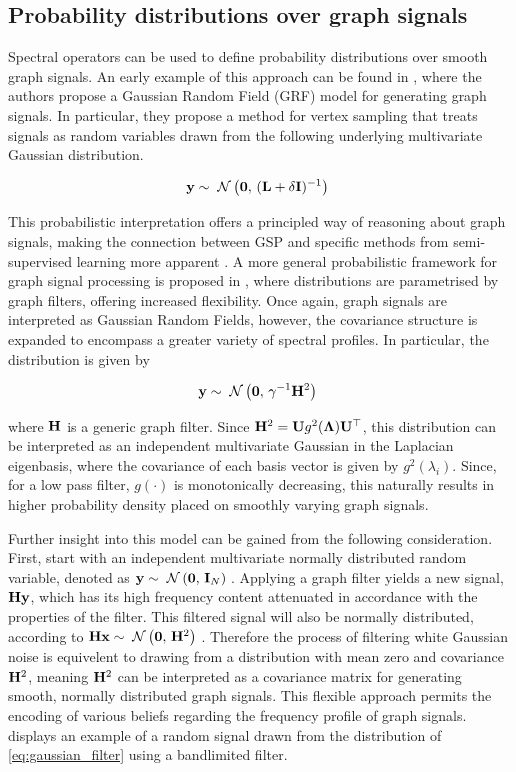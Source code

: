 \subsection{Probability distributions over graph signals}

Spectral operators can be used to define probability distributions over smooth graph signals. An early example of this approach can be found in \cite{Gadde2015}, where the authors propose a Gaussian Random Field (GRF) model for generating graph signals. In particular, they propose a method for vertex sampling that treats signals as random variables drawn from the following underlying multivariate Gaussian distribution.

\begin{equation}
\mathbf{y} \sim \; \mathcal{N}\left(\mathbf{0}, \, (\mathbf{L} + \delta \mathbf{I})^{-1}\right) \;
\end{equation}

This probabilistic interpretation offers a principled way of reasoning about graph signals, making the connection between GSP and specific methods from semi-supervised learning more apparent \citep{Zhu2003}. A more general probabilistic framework for graph signal processing is proposed in \cite{Zhang2015}, where distributions are parametrised by graph filters, offering increased flexibility. Once again, graph signals are interpreted as Gaussian Random Fields, however, the covariance structure is expanded to encompass a greater variety of spectral profiles. In particular, the distribution is given by 

\begin{equation}
    \label{eq:gaussian_filter}
    \mathbf{y} \sim \; \mathcal{N}\left(\mathbf{0}, \, \gamma^{-1} \mathbf{H}^2\right) \;
\end{equation}


where $\mathbf{H}$ is a generic graph filter. Since $\mathbf{H}^2 = \mathbf{U} g^2(\mathbf{\Lambda}) \mathbf{U}^\top$, this distribution can be interpreted as an independent multivariate Gaussian in the Laplacian eigenbasis, where the covariance of each basis vector is given by $g^2(\lambda_i)$. Since, for a low pass filter, $g(\cdot)$ is monotonically decreasing, this naturally results in higher probability density placed on smoothly varying graph signals. 


Further insight into this model can be gained from the following consideration. First, start with an independent multivariate normally distributed random variable, denoted as $\mathbf{y} \sim \; \mathcal{N}\left(\mathbf{0}, \, \mathbf{I}_N\right) \;$. Applying a graph filter yields a new signal, $\mathbf{H} \mathbf{y}$, which has its high frequency content attenuated in accordance with the properties of the filter. This filtered signal will also be normally distributed, according to $\mathbf{H} \mathbf{x} \sim \; \mathcal{N}\left(\mathbf{0}, \, \mathbf{H}^2\right) \;$. Therefore the process of filtering white Gaussian noise is equivelent to drawing from a distribution with mean zero and covariance $\mathbf{H}^2$, meaning $\mathbf{H}^2$ can be interpreted as a covariance matrix for generating smooth, normally distributed graph signals. This flexible approach permits the encoding of various beliefs regarding the frequency profile of graph signals.  displays an example of a random signal drawn from the distribution of \cref{eq:gaussian_filter} using a bandlimited filter.

